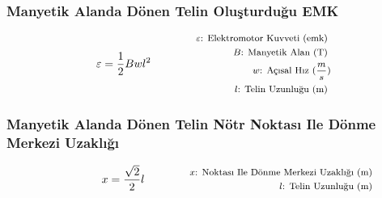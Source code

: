 \subsubsection*{Manyetik Alanda Dönen Telin Oluşturduğu EMK}
\begin{equation}
    \varepsilon = \frac{1}{2} Bwl^2 \qquad \qquad \parbox{4cm}{\footnotesize$\begin{aligned}
        \varepsilon\text{: Elektromotor Kuvveti (emk) } \\
        B\text{: Manyetik Alan (T) } \\
        w\text{: Açısal Hız } (\frac{m}{s}) \\
        l\text{: Telin Uzunluğu (m) }
\end{aligned}$}
\end{equation}

\subsubsection*{Manyetik Alanda Dönen Telin Nötr Noktası Ile Dönme Merkezi Uzaklığı}
\begin{equation}
    x = \frac{\sqrt{2}}{2} l \qquad \qquad \parbox{4cm}{\footnotesize$\begin{aligned}
        x\text{: Noktası Ile Dönme Merkezi Uzaklığı (m) } \\
        l\text{: Telin Uzunluğu (m) }
\end{aligned}$}
\end{equation}
